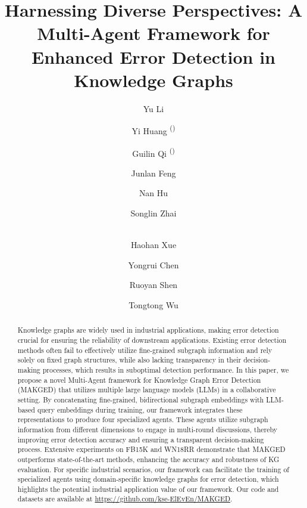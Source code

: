 \documentclass[runningheads]{llncs}
\begin{document}
%
\title{Harnessing Diverse Perspectives: A Multi-Agent Framework for Enhanced Error Detection in Knowledge Graphs}
%
%
\author{Yu Li\and
Yi Huang \textsuperscript{(\Letter)} \and
Guilin Qi \textsuperscript{(\Letter)} \and
Junlan Feng \and
Nan Hu \and
Songlin Zhai \and \\
Haohan Xue \and
Yongrui Chen \and
Ruoyan Shen \and
Tongtong Wu}
%
%
%

\maketitle             
%
\setcounter{footnote}{0}
\begin{abstract}
Knowledge graphs are widely used in industrial applications, making error detection crucial for ensuring the reliability of downstream applications. 
% 
Existing error detection methods often fail to effectively utilize fine-grained subgraph information and rely solely on fixed graph structures, while also lacking transparency in their decision-making processes, which results in suboptimal detection performance.
% 
In this paper, we propose a novel Multi-Agent framework for Knowledge Graph Error Detection (MAKGED) that utilizes multiple large language models (LLMs) in a collaborative setting. 
% 
By concatenating fine-grained, bidirectional subgraph embeddings with LLM-based query embeddings during training, our framework integrates these representations to produce four specialized agents. These agents utilize subgraph information from different dimensions to engage in multi-round discussions, thereby improving error detection accuracy and ensuring a transparent decision-making process.
%
Extensive experiments on FB15K and WN18RR demonstrate that MAKGED outperforms state-of-the-art methods, enhancing the accuracy and robustness of KG evaluation. 
For specific industrial scenarios, our framework can facilitate the training of specialized agents using domain-specific knowledge graphs for error detection, which highlights the potential industrial application value of our framework.
Our code and datasets are available at \url{https://github.com/kse-ElEvEn/MAKGED}.

\end{abstract}
%
\end{document}
